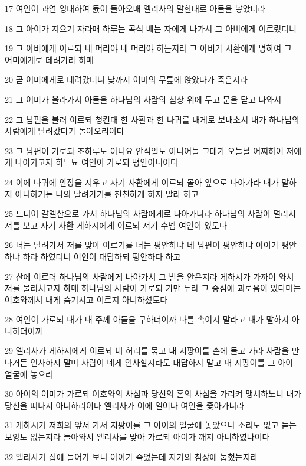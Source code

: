 \par 17 여인이 과연 잉태하여 돐이 돌아오매 엘리사의 말한대로 아들을 낳았더라
\par 18 그 아이가 저으기 자라매 하루는 곡식 베는 자에게 나가서 그 아비에게 이르렀더니
\par 19 그 아비에게 이르되 내 머리야 내 머리야 하는지라 그 아비가 사환에게 명하여 그 어미에게로 데려가라 하매
\par 20 곧 어미에게로 데려갔더니 낮까지 어미의 무릎에 앉았다가 죽은지라
\par 21 그 어미가 올라가서 아들을 하나님의 사람의 침상 위에 두고 문을 닫고 나와서
\par 22 그 남편을 불러 이르되 청컨대 한 사환과 한 나귀를 내게로 보내소서 내가 하나님의 사람에게 달려갔다가 돌아오리이다
\par 23 그 남편이 가로되 초하루도 아니요 안식일도 아니어늘 그대가 오늘날 어찌하여 저에게 나아가고자 하느뇨 여인이 가로되 평안이니이다
\par 24 이에 나귀에 안장을 지우고 자기 사환에게 이르되 몰아 앞으로 나아가라 내가 말하지 아니하거든 나의 달려가기를 천천하게 하지 말라 하고
\par 25 드디어 갈멜산으로 가서 하나님의 사람에게로 나아가니라 하나님의 사람이 멀리서 저를 보고 자기 사환 게하시에게 이르되 저기 수넴 여인이 있도다
\par 26 너는 달려가서 저를 맞아 이르기를 너는 평안하냐 네 남편이 평안하냐 아이가 평안하냐 하라 하였더니 여인이 대답하되 평안하다 하고
\par 27 산에 이르러 하나님의 사람에게 나아가서 그 발을 안은지라 게하시가 가까이 와서 저를 물리치고자 하매 하나님의 사람이 가로되 가만 두라 그 중심에 괴로움이 있다마는 여호와께서 내게 숨기시고 이르지 아니하셨도다
\par 28 여인이 가로되 내가 내 주께 아들을 구하더이까 나를 속이지 말라고 내가 말하지 아니하더이까
\par 29 엘리사가 게하시에게 이르되 네 허리를 묶고 내 지팡이를 손에 들고 가라 사람을 만나거든 인사하지 말며 사람이 네게 인사할지라도 대답하지 말고 내 지팡이를 그 아이 얼굴에 놓으라
\par 30 아이의 어미가 가로되 여호와의 사심과 당신의 혼의 사심을 가리켜 맹세하노니 내가 당신을 떠나지 아니하리이다 엘리사가 이에 일어나 여인을 좇아가니라
\par 31 게하시가 저희의 앞서 가서 지팡이를 그 아이의 얼굴에 놓았으나 소리도 없고 듣는 모양도 없는지라 돌아와서 엘리사를 맞아 가로되 아이가 깨지 아니하였나이다
\par 32 엘리사가 집에 들어가 보니 아이가 죽었는데 자기의 침상에 눕혔는지라
